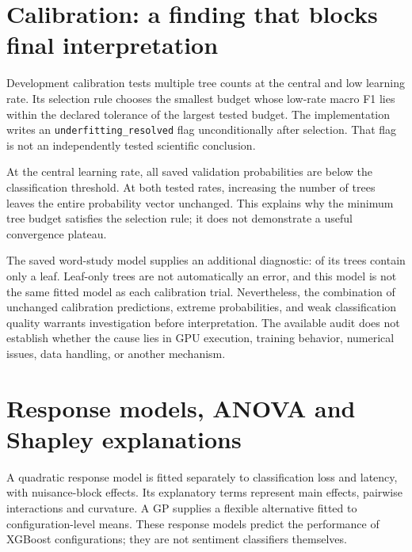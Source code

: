 \documentclass[12pt,a4paper]{article}
\begin{document}
\section{Calibration: a finding that blocks final interpretation}
Development calibration tests multiple tree counts at the central and low learning rate. Its selection rule chooses the smallest budget whose low-rate macro F1 lies within the declared tolerance of the largest tested budget. The implementation writes an \texttt{underfitting\_resolved} flag unconditionally after selection. That flag is not an independently tested scientific conclusion.

\begin{table}[htbp]\centering\small

\caption{Calibration observations reconstructed from the saved pilot predictions. Coded learning rate is shown. The full probability arrays, not just the displayed rounded metrics, are identical across tree counts within each rate. These observations are diagnostic and do not establish learning adequacy.}
\end{table}

At the central learning rate, all saved validation probabilities are below the classification threshold. At both tested rates, increasing the number of trees leaves the entire probability vector unchanged. This explains why the minimum tree budget satisfies the selection rule; it does not demonstrate a useful convergence plateau.

The saved word-study model supplies an additional diagnostic: \LeafTrees{} of its \TreeCount{} trees contain only a leaf. Leaf-only trees are not automatically an error, and this model is not the same fitted model as each calibration trial. Nevertheless, the combination of unchanged calibration predictions, extreme probabilities, and weak classification quality warrants investigation before interpretation. The available audit does not establish whether the cause lies in GPU execution, training behavior, numerical issues, data handling, or another mechanism.

\section{Response models, ANOVA and Shapley explanations}
A quadratic response model is fitted separately to classification loss and latency, with nuisance-block effects. Its explanatory terms represent main effects, pairwise interactions and curvature. A GP supplies a flexible alternative fitted to configuration-level means. These response models predict the performance of XGBoost configurations; they are not sentiment classifiers themselves.
\end{document}
